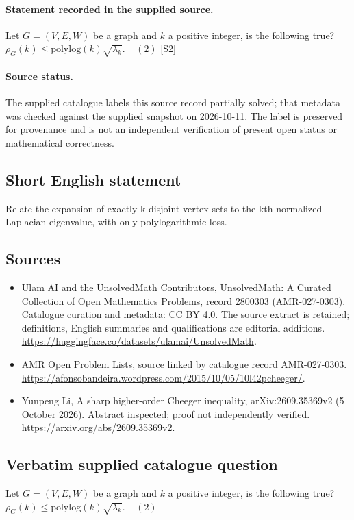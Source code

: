 \documentclass[11pt]{article}
\begin{document}
\paragraph{Statement recorded in the supplied source.}
Let ${G=(V,E,W)}$ be a graph and ${k}$ a positive integer, is the following true? $\rho_G(k) \leq \mathrm{polylog}(k) \sqrt{\lambda_k}. \ \ \ \ \ (2)$ \href{https://afonsobandeira.wordpress.com/2015/10/05/10l42pcheeger/}{[S2]}
\paragraph{Source status.}
The supplied catalogue labels this source record partially solved; that metadata was checked against the supplied snapshot on 2026-10-11. The label is preserved for provenance and is not an independent verification of present open status or mathematical correctness.
\subsection{Short English statement}
Relate the expansion of exactly k disjoint vertex sets to the kth normalized-Laplacian eigenvalue, with only polylogarithmic loss.
\subsection{Sources}
\begin{itemize}
\item[S1] Ulam AI and the UnsolvedMath Contributors, UnsolvedMath: A Curated Collection of Open Mathematics Problems, record 2800303 (AMR-027-0303). Catalogue curation and metadata: CC BY 4.0. The source extract is retained; definitions, English summaries and qualifications are editorial additions.
\url{https://huggingface.co/datasets/ulamai/UnsolvedMath}.
\item[S2] AMR Open Problem Lists, source linked by catalogue record AMR-027-0303.
\url{https://afonsobandeira.wordpress.com/2015/10/05/10l42pcheeger/}.
\item[S3] Yunpeng Li, A sharp higher-order Cheeger inequality, arXiv:2609.35369v2 (5 October 2026). Abstract inspected; proof not independently verified.
\url{https://arxiv.org/abs/2609.35369v2}.
\end{itemize}
\subsection{Verbatim supplied catalogue question}
Let ${G=(V,E,W)}$ be a graph and ${k}$ a positive integer, is the following true? $\rho_G(k) \leq \mathrm{polylog}(k) \sqrt{\lambda_k}. \ \ \ \ \ (2)$
\end{document}
